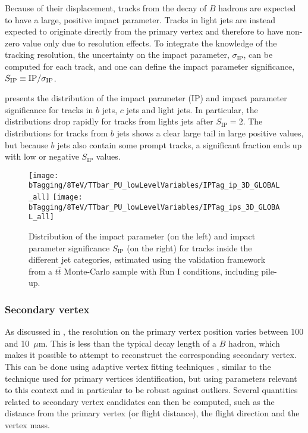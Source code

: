    Because of their displacement, tracks from the decay of $B$ hadrons are expected to
    have a large, positive impact parameter. Tracks in light jets are instead expected
    to originate directly from the primary vertex and therefore to have non-zero value
    only due to resolution effects. To integrate the knowledge of the tracking resolution,
    the uncertainty on the impact parameter, $\sigma_\text{IP}$, can be computed for each
    track, and one can define the impact parameter significance, $S_\text{IP} \equiv
    \text{IP}/\sigma_\text{IP}$.

     presents the distribution of the
    impact parameter (IP) and impact parameter significance for tracks in $b$ jets, $c$
    jets and light jets. In particular, the distributions drop rapidly for tracks from
    lights jets after $S_\text{IP} = 2$. The distributions for tracks from $b$ jets shows
    a clear large tail in large positive values, but because $b$ jets also contain some
    prompt tracks, a significant fraction ends up with low or negative $S_\text{IP}$
    values.

    \begin{figure}[th!]
        \centering
        \begin{minipage}{\textwidth}
        \texttt{[image: bTagging/8TeV/TTbar\_PU\_lowLevelVariables/IPTag\_ip\_3D\_GLOBAL\_all]}
        \texttt{[image: bTagging/8TeV/TTbar\_PU\_lowLevelVariables/IPTag\_ips\_3D\_GLOBAL\_all]}
        \end{minipage}
        \caption{Distribution of the impact parameter (on the left) and impact parameter significance
        $S_\text{IP}$ (on the right) for tracks
        inside the different jet categories, estimated using the validation framework from a
        $t\bar{t}$ Monte-Carlo sample with Run I conditions, including pile-up.}
        \label{fig:bTagging/impactParameterDistr}
    \end{figure}

    \subsubsection{Secondary vertex}

    As discussed in , the resolution on the primary
    vertex position varies between 100 and 10~$\mu$m. This is less than the typical decay length
    of a $B$ hadron, which makes it possible to attempt to reconstruct the corresponding
    secondary vertex. This can be done using adaptive vertex fitting techniques \cite{AdaptiveVertexFitting},
    similar to the technique used for primary vertices identification, but using parameters
    relevant to this context and in particular to be robust against outliers. Several
    quantities related to secondary vertex candidates can then be computed, such as the
    distance from the primary vertex (or flight distance), the flight direction and the
    vertex mass.


